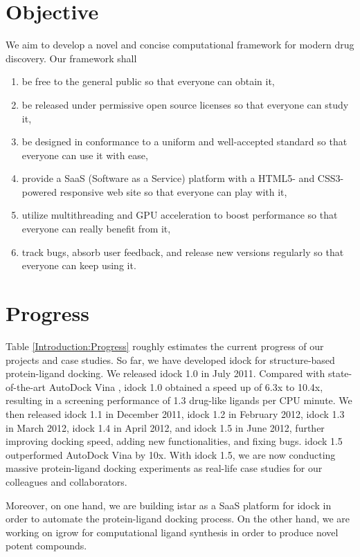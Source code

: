 \section{Objective}

We aim to develop a novel and concise computational framework for modern drug discovery. Our framework shall
\begin{enumerate}
\item be free to the general public so that everyone can obtain it,
\item be released under permissive open source licenses so that everyone can study it,
\item be designed in conformance to a uniform and well-accepted standard so that everyone can use it with ease,
\item provide a SaaS (Software as a Service) platform with a HTML5- and CSS3-powered responsive web site so that everyone can play with it,
\item utilize multithreading and GPU acceleration to boost performance so that everyone can really benefit from it,
\item track bugs, absorb user feedback, and release new versions regularly so that everyone can keep using it.
\end{enumerate}

\section{Progress}

Table \ref{Introduction:Progress} roughly estimates the current progress of our projects and case studies. So far, we have developed idock for structure-based protein-ligand docking. We released idock 1.0 in July 2011. Compared with state-of-the-art AutoDock Vina \citep{595}, idock 1.0 obtained a speed up of 6.3x to 10.4x, resulting in a screening performance of 1.3 drug-like ligands per CPU minute. We then released idock 1.1 in December 2011, idock 1.2 in February 2012, idock 1.3 in March 2012, idock 1.4 in April 2012, and idock 1.5 in June 2012, further improving docking speed, adding new functionalities, and fixing bugs. idock 1.5 outperformed AutoDock Vina by 10x. With idock 1.5, we are now conducting massive protein-ligand docking experiments as real-life case studies for our colleagues and collaborators.

Moreover, on one hand, we are building istar as a SaaS platform for idock in order to automate the protein-ligand docking process. On the other hand, we are working on igrow for computational ligand synthesis in order to produce novel potent compounds.

